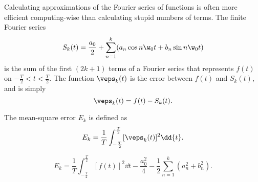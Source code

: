 Calculating approximations of the Fourier series of functions is often more efficient computing-wise than calculating stupid numbers of terms. The finite Fourier series \begin{equation} S_k(t)=\frac{a_0}{2}+\sum_{n=1}^k(a_n\cos n\w_0t+b_n\sin n\w_0t)
\end{equation} is the sum of the first $(2k+1)$ terms of a Fourier series that represents $f(t)$ on $-\frac T2<t<\frac T2$. The function $\veps_k(t)$ is the error between $f(t)$ and $S_k(t)$, and is simply $$\veps_k(t)=f(t)-S_k(t).$$

\begin{defn} The mean-square error $E_k$ is defined as \begin{equation} E_k=\frac 1T\int_{-\frac T2}^{\frac T2}[\veps_k(t)]^2\dd{t}.
\end{equation}
\end{defn}

\begin{claim} \begin{equation} E_k=\frac 1T\int_{-\frac T2}^{\frac T2}[f(t)]^2\dd{t}-\frac{a_0^2}{4}-\frac12\sum_{n=1}^k(a_n^2+b_n^2).
\end{equation} \end{claim}

